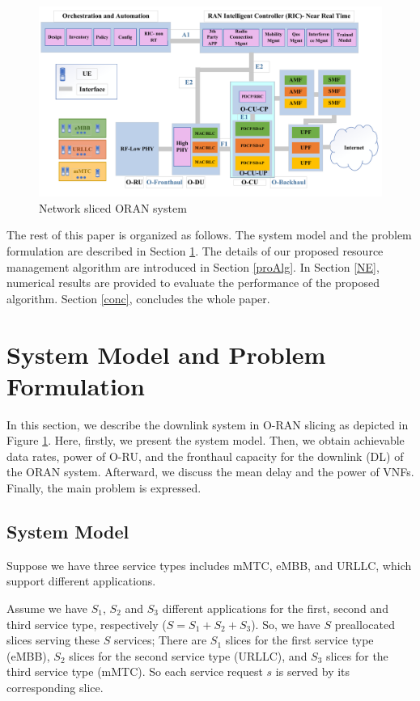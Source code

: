\documentclass[conference]{IEEEtran}
\begin{document}
\begin{figure}
  \centering 
    \includegraphics[scale = 0.7]{finalDraw.pdf}
  \caption{Network sliced ORAN system}
  \label{fig:c11}
\end{figure}

The rest of this paper is organized as follows. The system model and the problem formulation are described in Section \ref{systemmodel}. The details of our proposed resource management algorithm are introduced in Section \ref{proAlg}. In Section \ref{NE}, numerical results are provided to evaluate the performance of the proposed algorithm. Section \ref{conc}, concludes the whole paper.

\section{System Model and Problem Formulation}\label{systemmodel}

In this section, we describe the downlink system in O-RAN slicing as depicted in Figure \ref{fig:c11}. 
Here, firstly, we present the system model. Then, we obtain achievable data rates, power of O-RU, and the fronthaul capacity for the downlink (DL) of the ORAN system. Afterward, we discuss the mean delay and the power of VNFs.
Finally, the main problem is expressed.
\subsection{System Model}
Suppose we have three service types includes mMTC, eMBB, and URLLC, which support different applications.

Assume we have $S_1$, $S_2$ and $S_3$ different applications for the first, second and third service type, respectively ($S = S_1 + S_2 + S_3$).
So, we have $S$ preallocated slices serving these $S$ services; There are $S_1$ slices for the first service type (eMBB), $S_2$ slices for the second service type (URLLC), and $S_3$ slices for the third service type (mMTC). So each service request $s$ is served by its corresponding slice.
\end{document}
